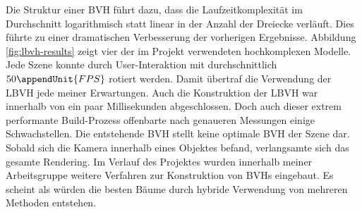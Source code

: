 \documentclass[crop=false]{standalone}
\begin{document}
      Die Struktur einer BVH führt dazu, dass die Laufzeitkomplexität im Durchschnitt logarithmisch statt linear in der Anzahl der Dreiecke verläuft.
      Dies führte zu einer dramatischen Verbesserung der vorherigen Ergebnisse.
      Abbildung \ref{fig:lbvh-results} zeigt vier der im Projekt verwendeten hochkomplexen Modelle.
      Jede Szene konnte durch User-Interaktion mit durchschnittlich $50\appendUnit{FPS}$ rotiert werden.
      Damit übertraf die Verwendung der LBVH jede meiner Erwartungen.
      Auch die Konstruktion der LBVH war innerhalb von ein paar Millisekunden abgeschlossen.
      Doch auch dieser extrem performante Build-Prozess offenbarte nach genaueren Messungen einige Schwachstellen.
      Die entstehende BVH stellt keine optimale BVH der Szene dar.
      Sobald sich die Kamera innerhalb eines Objektes befand, verlangsamte sich das gesamte Rendering.
      Im Verlauf des Projektes wurden innerhalb meiner Arbeitsgruppe weitere Verfahren zur Konstruktion von BVHs eingebaut.
      Es scheint als würden die besten Bäume durch hybride Verwendung von mehreren Methoden entstehen.
\end{document}
